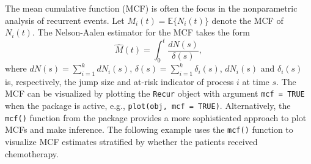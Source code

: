 The mean cumulative function (MCF) is often the focus in the
nonparametric analysis of recurrent events. Let
\(M_i(t)=\mathbb{E}\{N_i(t)\}\) denote the MCF of \(N_i(t)\). The
Nelson-Aalen estimator \citep{nelson2003siam} for the MCF takes the form
\[\widehat{M}(t) = \int_0^t \frac{dN(s)}{\delta(s)},\] where
\(dN(s)=\sum_{i=1}^k dN_i(s)\),
\(\delta(s) = \sum_{i=1}^k \delta_i(s)\), \(dN_i(s)\) and
\(\delta_i(s)\) is, respectively, the jump size and at-risk indicator of
process \(i\) at time \(s\). The MCF can be visualized by plotting the
\texttt{Recur} object with argument \texttt{mcf\ =\ TRUE} when the
 package is active, e.g., \texttt{plot(obj,\ mcf\ =\ TRUE)}.
Alternatively, the \texttt{mcf()} function from the  package
provides a more sophisticated approach to plot MCFs and make inference.
The following example uses the \texttt{mcf()} function to visualize MCF
estimates stratified by whether the patients received chemotherapy.

\begin{Shaded}
\begin{Highlighting}[]
\StringTok{ } 
 \NormalTok{, } \NormalTok{:}\NormalTok{) +}
\StringTok{    }\NormalTok{(} 
\end{Highlighting}
\end{Shaded}

